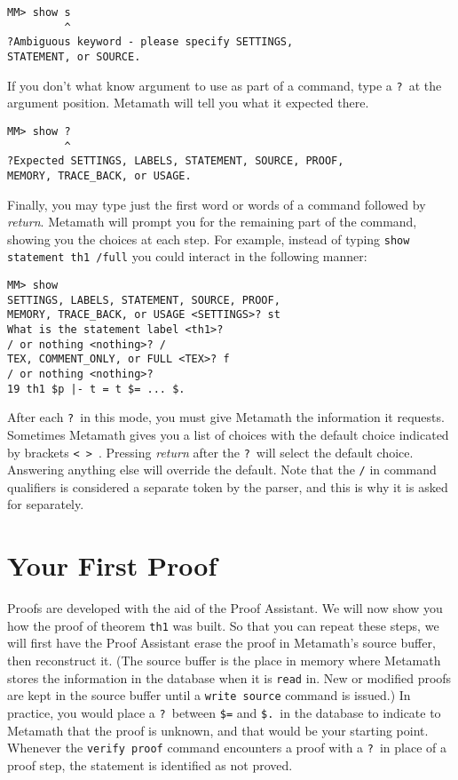 \begin{verbatim}
MM> show s
         ^
?Ambiguous keyword - please specify SETTINGS,
STATEMENT, or SOURCE.
\end{verbatim}

If you don't what know argument to use as part of a command, type a
\texttt{?}\index{\texttt{]}@\texttt{?}\ in command lines}\ at the
argument position.  Metamath will tell you what it expected there.

\begin{verbatim}
MM> show ?
         ^
?Expected SETTINGS, LABELS, STATEMENT, SOURCE, PROOF,
MEMORY, TRACE_BACK, or USAGE.
\end{verbatim}

Finally, you may type just the first word or words of a command followed
by {\em return}.  Metamath will prompt you for the remaining part of the
command, showing you the choices at each step.  For example, instead of
typing \texttt{show statement th1 /full} you could interact in the
following manner:
\begin{verbatim}
MM> show
SETTINGS, LABELS, STATEMENT, SOURCE, PROOF,
MEMORY, TRACE_BACK, or USAGE <SETTINGS>? st
What is the statement label <th1>?
/ or nothing <nothing>? /
TEX, COMMENT_ONLY, or FULL <TEX>? f
/ or nothing <nothing>?
19 th1 $p |- t = t $= ... $.
\end{verbatim}
After each \texttt{?}\ in this mode, you must give Metamath the
information it requests.  Sometimes Metamath gives you a list of choices
with the default choice indicated by brackets \texttt{< > }. Pressing
{\em return} after the \texttt{?}\ will select the default choice.
Answering anything else will override the default.  Note that the
\texttt{/} in command qualifiers is considered a separate
token by the parser, and this is why it is asked for
separately.

\section{Your First Proof}\label{frstprf}

Proofs are developed with the aid of the Proof Assistant.  We will now show you how the proof of theorem \texttt{th1}
was built.  So that you can repeat these steps, we will first have the
Proof Assistant erase the proof in Metamath's source buffer, then reconstruct it.  (The source buffer is the place in memory
where Metamath stores the information in the database when it is
\texttt{read} in.  New or modified proofs
are kept in the source buffer until a \texttt{write source}
command is issued.)  In practice, you
would place a \texttt{?}\index{\texttt{]}@\texttt{?}\ inside proofs}\
between \texttt{\$=} and
\texttt{\$.}\ in the database to indicate
to Metamath\index{Metamath} that the proof is unknown, and that would be
your starting point.  Whenever the \texttt{verify proof} command encounters
a proof with a \texttt{?}\ in place of a proof step, the statement is
identified as not proved.

